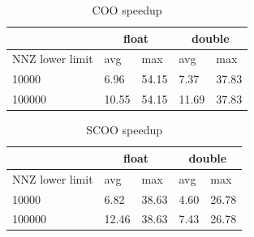 \documentclass{article}
\begin{document}
\begin{table}[H]
	\centering
	\begin{tabular}{ |p{2.6cm}||p{1cm}|p{1cm}|p{1cm}|p{1cm}|  }
	 \hline
		& \multicolumn{2}{|c|}{float} & \multicolumn{2}{|c|}{double}\\
	 \hline
	 NNZ lower limit & avg & max & avg & max  \\
	 \hline
	 10000  & 6.96  & 54.15 & 7.37  & 37.83 \\
	 100000 & 10.55 & 54.15 & 11.69 & 37.83 \\
	 \hline
	\end{tabular}
	\caption{COO speedup}
  \label{csr_coo_speedup_table}
\end{table}

\begin{figure}[H]
\centering
{}
\qquad %
\end{figure}

\begin{table}[H]
	\centering
	\begin{tabular}{ |p{2.6cm}||p{1cm}|p{1cm}|p{1cm}|p{1cm}|  }
	 \hline
		& \multicolumn{2}{|c|}{float} & \multicolumn{2}{|c|}{double}\\
	 \hline
	 NNZ lower limit & avg & max & avg & max  \\
	 \hline
	 10000  & 6.82  & 38.63 & 4.60 & 26.78 \\
	 100000 & 12.46 & 38.63 & 7.43 & 26.78 \\
	 \hline
	\end{tabular}
	\caption{SCOO speedup}
  \label{scoo_speedup_table}
\end{table}
\end{document}
